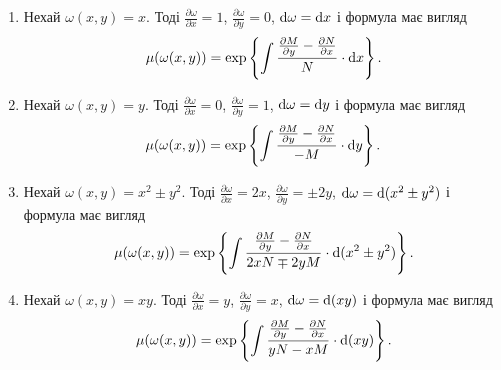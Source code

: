 \begin{enumerate}
	\item Нехай $\omega(x, y) = x$. Тоді $\frac{\partial \omega}{\partial x} = 1$, $\frac{\partial \omega}{\partial y} = 0$, $\mathop{}\!\mathrm{d} \omega = \mathop{}\!\mathrm{d} x$ і формула має вигляд
	\begin{equation*}
		\mu(\omega(x,y)) = \exp\left\{\int \frac{\frac{\partial M}{\partial y} - \frac{\partial N}{\partial x} }{N} \cdot \mathop{}\!\mathrm{d} x\right\}.
	\end{equation*}	
	\item Нехай $\omega(x, y) = y$. Тоді $\frac{\partial \omega}{\partial x} = 0$, $\frac{\partial \omega}{\partial y} = 1$, $\mathop{}\!\mathrm{d} \omega = \mathop{}\!\mathrm{d} y$ і формула має вигляд
	\begin{equation*}
		\mu(\omega(x,y)) = \exp\left\{\int \frac{\frac{\partial M}{\partial y} - \frac{\partial N}{\partial x} }{-M} \cdot \mathop{}\!\mathrm{d} y\right\}.
	\end{equation*}
	\item Нехай $\omega(x, y) = x^2 \pm y^2$. Тоді $\frac{\partial \omega}{\partial x} = 2 x$, $\frac{\partial \omega}{\partial y} = \pm 2y$, $\mathop{}\!\mathrm{d} \omega = \mathop{}\!\mathrm{d} (x^2 \pm y^2)$ і формула має вигляд
	\begin{equation*}
		\mu(\omega(x,y)) = \exp\left\{\int \frac{\frac{\partial M}{\partial y} - \frac{\partial N}{\partial x} }{2 x N \mp 2 y M} \cdot \mathop{}\!\mathrm{d} (x^2 \pm y^2)\right\}.
	\end{equation*}
	\item Нехай $\omega(x, y) = x y$. Тоді $\frac{\partial \omega}{\partial x} = y$, $\frac{\partial \omega}{\partial y} = x$, $\mathop{}\!\mathrm{d} \omega = \mathop{}\!\mathrm{d} (xy)$ і формула має вигляд
	\begin{equation*}
		\mu(\omega(x,y)) = \exp\left\{\int \frac{\frac{\partial M}{\partial y} - \frac{\partial N}{\partial x} }{yN-xM} \cdot \mathop{}\!\mathrm{d} (xy)\right\}.
	\end{equation*}
\end{enumerate}
